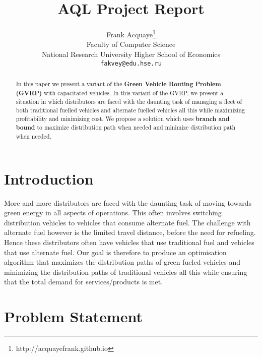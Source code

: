 \documentclass{article}
\title{AQL Project Report}
\author{%
  Frank Acquaye\thanks{http://acquayefrank.github.io} \\
  Faculty of Computer Science\\
  National Research University Higher School of Economics\\
  \texttt{fakvey@edu.hse.ru} \\
}
\begin{document}
\maketitle

\begin{abstract}
	In this paper we present a variant of the \textbf{Green Vehicle Routing Problem (GVRP)} with capacitated vehicles. In this variant of the GVRP, we present a situation in which distributors are faced with the daunting task of  managing a fleet of both traditional fuelled vehicles and alternate fuelled vehicles all this while maximizing profitability and minimizing cost. We propose a solution which uses \textbf{branch and bound} to maximize distribution path when needed and minimize distribution path when needed.
 \end{abstract}

\section{Introduction}
More and more distributors are faced with the daunting task of moving towards green energy in all aspects of operations. This often involves switching distribution vehicles to vehicles that consume alternate fuel. The challenge with alternate fuel however is the limited travel distance, before the need for refueling. Hence these distributors often have vehicles that use traditional fuel and vehicles that use alternate fuel. Our goal is therefore to produce an optimisation algorithm that maximizes the distribution paths of green fueled vehicles and minimizing the distribution paths of traditional vehicles all this while ensuring that  the total demand for services/products is met.  

\section{Problem Statement}
\end{document}
